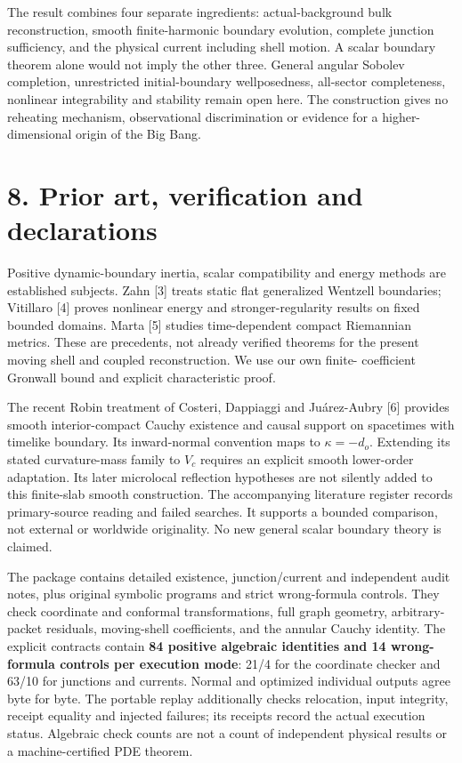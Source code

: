 \documentclass[
  10pt,
]{article}
\begin{document}
The result combines four separate ingredients: actual-background bulk
reconstruction, smooth finite-harmonic boundary evolution, complete
junction sufficiency, and the physical current including shell motion. A
scalar boundary theorem alone would not imply the other three. General
angular Sobolev completion, unrestricted initial-boundary wellposedness,
all-sector completeness, nonlinear integrability and stability remain
open here. The construction gives no reheating mechanism, observational
discrimination or evidence for a higher-dimensional origin of the Big
Bang.

\section{8. Prior art, verification and
declarations}\label{prior-art-verification-and-declarations}

Positive dynamic-boundary inertia, scalar compatibility and energy
methods are established subjects. Zahn {[}3{]} treats static flat
generalized Wentzell boundaries; Vitillaro {[}4{]} proves nonlinear
energy and stronger-regularity results on fixed bounded domains. Marta
{[}5{]} studies time-dependent compact Riemannian metrics. These are
precedents, not already verified theorems for the present moving shell
and coupled reconstruction. We use our own finite- coefficient Gronwall
bound and explicit characteristic proof.

The recent Robin treatment of Costeri, Dappiaggi and Juárez-Aubry
{[}6{]} provides smooth interior-compact Cauchy existence and causal
support on spacetimes with timelike boundary. Its inward-normal
convention maps to \(\kappa=-d_o\). Extending its stated curvature-mass
family to \(V_c\) requires an explicit smooth lower-order adaptation.
Its later microlocal reflection hypotheses are not silently added to
this finite-slab smooth construction. The accompanying literature
register records primary-source reading and failed searches. It supports
a bounded comparison, not external or worldwide originality. No new
general scalar boundary theory is claimed.

The package contains detailed existence, junction/current and
independent audit notes, plus original symbolic programs and strict
wrong-formula controls. They check coordinate and conformal
transformations, full graph geometry, arbitrary-packet residuals,
moving-shell coefficients, and the annular Cauchy identity. The explicit
contracts contain \textbf{84 positive algebraic identities and 14
wrong-formula controls per execution mode}: 21/4 for the coordinate
checker and 63/10 for junctions and currents. Normal and optimized
individual outputs agree byte for byte. The portable replay additionally
checks relocation, input integrity, receipt equality and injected
failures; its receipts record the actual execution status. Algebraic
check counts are not a count of independent physical results or a
machine-certified PDE theorem.
\end{document}
